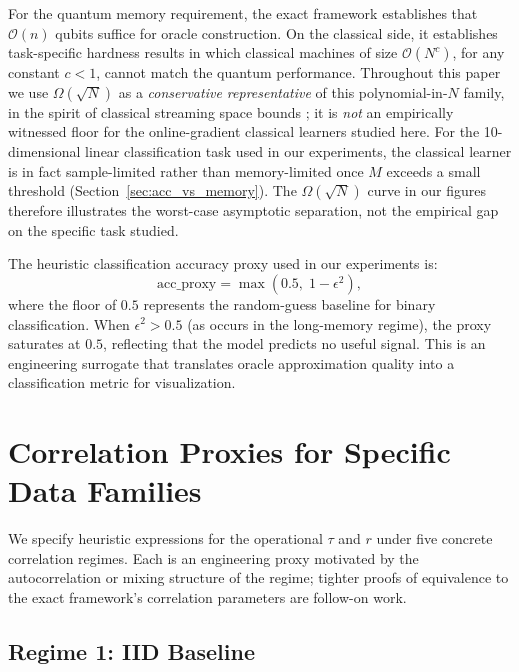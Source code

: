 \documentclass[preprint,12pt,authoryear]{elsarticle}
\newcommand{\bigO}{\mathcal{O}}
\begin{document}
For the quantum memory requirement, the exact framework establishes that $\bigO(n)$ qubits suffice for oracle construction. On the classical side, it establishes task-specific hardness results in which classical machines of size $\bigO(N^{c})$, for any constant $c < 1$, cannot match the quantum performance. Throughout this paper we use $\Omega(\sqrt{N})$ as a \emph{conservative representative} of this polynomial-in-$N$ family, in the spirit of classical streaming space bounds \citep{alon1999space, kallaugher2021streaming}; it is \emph{not} an empirically witnessed floor for the online-gradient classical learners studied here. For the 10-dimensional linear classification task used in our experiments, the classical learner is in fact sample-limited rather than memory-limited once $M$ exceeds a small threshold (Section~\ref{sec:acc_vs_memory}). The $\Omega(\sqrt{N})$ curve in our figures therefore illustrates the worst-case asymptotic separation, not the empirical gap on the specific task studied.

The heuristic classification accuracy proxy used in our experiments is:
\begin{equation}
\mathrm{acc\_proxy} = \max\!\left(0.5,\; 1 - \epsilon^2\right),
\label{eq:acc_proxy}
\end{equation}
where the floor of $0.5$ represents the random-guess baseline for binary classification. When $\epsilon^2 > 0.5$ (as occurs in the long-memory regime), the proxy saturates at $0.5$, reflecting that the model predicts no useful signal. This is an engineering surrogate that translates oracle approximation quality into a classification metric for visualization.


\section{Correlation Proxies for Specific Data Families}
\label{sec:theory}

We specify heuristic expressions for the operational $\tau$ and $r$ under five concrete correlation regimes. Each is an engineering proxy motivated by the autocorrelation or mixing structure of the regime; tighter proofs of equivalence to the exact framework's correlation parameters are follow-on work.

\subsection{Regime 1: IID Baseline}
\end{document}
